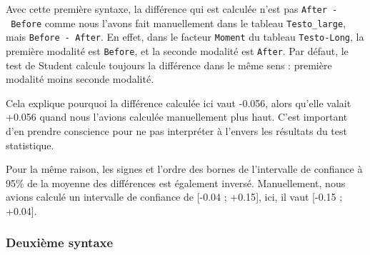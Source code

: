 \documentclass[
  a4paper,
  DIV=11,
  numbers=noendperiod,
  oneside]{scrreprt}
\newenvironment{Shaded}{}{}
\newcommand{\AttributeTok}[1]{\textcolor[rgb]{0.84,0.23,0.29}{#1}}
\newcommand{\CommentTok}[1]{\textcolor[rgb]{0.42,0.45,0.49}{#1}}
\newcommand{\ConstantTok}[1]{\textcolor[rgb]{0.00,0.36,0.77}{#1}}
\newcommand{\FunctionTok}[1]{\textcolor[rgb]{0.44,0.26,0.76}{#1}}
\newcommand{\NormalTok}[1]{\textcolor[rgb]{0.14,0.16,0.18}{#1}}
\newcommand{\SpecialCharTok}[1]{\textcolor[rgb]{0.00,0.36,0.77}{#1}}
\begin{document}
\begin{tcolorbox}[enhanced jigsaw, breakable, toprule=.15mm, colbacktitle=quarto-callout-warning-color!10!white, colframe=quarto-callout-warning-color-frame, arc=.35mm, bottomtitle=1mm, opacityback=0, title=\textcolor{quarto-callout-warning-color}{\faExclamationTriangle}\hspace{0.5em}{Point de vigilance}, bottomrule=.15mm, colback=white, toptitle=1mm, rightrule=.15mm, leftrule=.75mm, opacitybacktitle=0.6, left=2mm, titlerule=0mm, coltitle=black]

Avec cette première syntaxe, la différence qui est calculée n'est pas
\texttt{After\ -\ Before} comme nous l'avons fait manuellement dans le
tableau \texttt{Testo\_large}, mais \texttt{Before\ -\ After}. En effet,
dans le facteur \texttt{Moment} du tableau \texttt{Testo-Long}, la
première modalité est \texttt{Before}, et la seconde modalité est
\texttt{After}. Par défaut, le test de Student calcule toujours la
différence dans le même sens : première modalité moins seconde modalité.

Cela explique pourquoi la différence calculée ici vaut -0.056, alors
qu'elle valait +0.056 quand nous l'avions calculée manuellement plus
haut. C'est important d'en prendre conscience pour ne pas interpréter à
l'envers les résultats du test statistique.

Pour la même raison, les signes et l'ordre des bornes de l'intervalle de
confiance à 95\% de la moyenne des différences est également inversé.
Manuellement, nous avions calculé un intervalle de confiance de {[}-0.04
; +0.15{]}, ici, il vaut {[}-0.15 ; +0.04{]}.

\end{tcolorbox}

\hypertarget{deuxiuxe8me-syntaxe}{%
\subsubsection{Deuxième syntaxe}\label{deuxiuxe8me-syntaxe}}

\begin{Shaded}
\end{Shaded}
\end{document}
